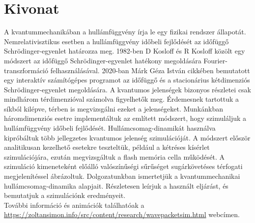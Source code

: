 \section*{Kivonat}

A kvantummechanikában a hullámfüggvény írja le egy fizikai rendszer állapotát. Nemrelativisztikus esetben a hullámfüggvény időbeli fejlődését az időfüggő Schrödinger-egyenlet határozza meg. 1982-ben D Kosloff és R Kosloff közölt egy módszert \cite{KOSLOFF198335} az időfüggő Schrödinger-egyenlet hatékony megoldására Fourier-transzformáció felhasználásával. 2020-ban Márk Géza István cikkében \cite{mark2020webschrodinger} bemutatott egy interaktív szá\-mí\-tó\-gé\-pes programot az időfüggő és a stacionárius kétdimenziós Schrödinger-egyenlet megoldására. A kvantumos jelenségek bizonyos részletei csak mindhárom térdimenzióval számolva figyelhetők meg. Érdemesnek tartottuk a síkból kilépve, térben is megvizsgálni ezeket a jelenségeket. Munkánkban háromdimenziós esetre implementáltuk az említett módszert, hogy szimuláljuk a hullámfüggvény időbeli fejlődését. Hullámcsomag-dinamikát használva kipróbáltuk több jellegzetes kvantumos jelenség szimulációját. A módszert először analitikusan kezelhető esetekre teszteltük, például a kétréses kísérlet szimulációjára, ezután megvizsgáltuk a flash memória cella működését. A szimuláció kimeneteként előálló valószínűségi sűrűséget sugárkövetéses térfogati megjelenítéssel ábrázoltuk. Dolgozatunkban ismertetjük a kvantummechanikai hullámcsomag-dinamika alapjait. Részletesen leírjuk a használt eljárást, és bemutatjuk a szimulációnk eredményeit.\\
További információ és animációk találhatóak a\\ \url{https://zoltansimon.info/src/content/research/wavepacketsim.html} webcímen.

